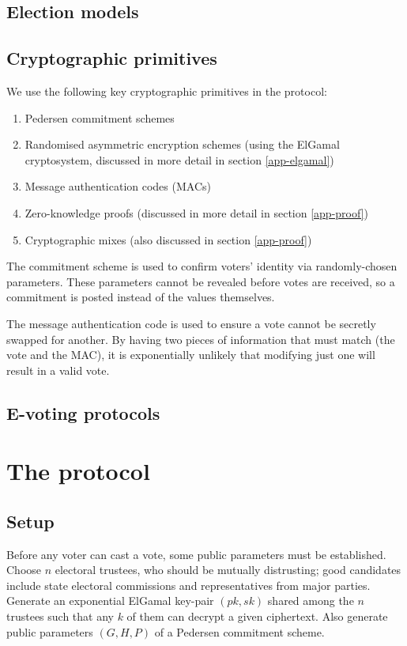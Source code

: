 \documentclass[11pt,twoside,a4paper]{article}
\theoremstyle{definition}
\begin{document}
\subsection{Election models}
\subsection{Cryptographic primitives}
We use the following key cryptographic primitives in the protocol:
\begin{enumerate}
    \item Pedersen commitment schemes
    \item Randomised asymmetric encryption schemes (using the ElGamal cryptosystem, discussed in more detail in section \ref{app-elgamal})
    \item Message authentication codes (MACs)
    \item Zero-knowledge proofs (discussed in more detail in section \ref{app-proof})
    \item Cryptographic mixes (also discussed in section \ref{app-proof})
\end{enumerate}
The commitment scheme is used to confirm voters' identity via randomly-chosen parameters. These parameters cannot be revealed before votes are received, so a commitment is posted instead of the values themselves.

The message authentication code is used to ensure a vote cannot be secretly swapped for another. By having two pieces of information that must match (the vote and the MAC), it is exponentially unlikely that modifying just one will result in a valid vote.
\subsection{E-voting protocols}
\section{The protocol}\label{sec-protocol}
\subsection{Setup}
Before any voter can cast a vote, some public parameters must be established. Choose \(n\) electoral trustees, who should be mutually distrusting; good candidates include state electoral commissions and representatives from major parties. Generate an exponential ElGamal key-pair \((pk, sk)\) shared among the \(n\) trustees such that any \(k\) of them can decrypt a given ciphertext. Also generate public parameters \((G, H, P)\) of a Pedersen commitment scheme.
\end{document}
